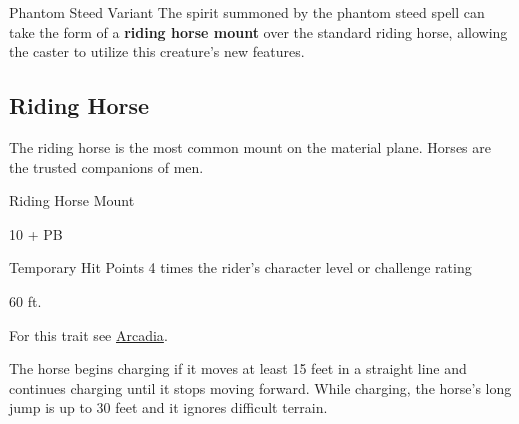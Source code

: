 \documentclass[letterpaper,twocolumn,openany,nodeprecatedcode]{dndbook}
\begin{document}
\begin{DndComment}{Phantom Steed Variant}
    The spirit summoned by the phantom steed spell can take the form of a \textbf{riding horse mount} over the standard riding horse, allowing the caster to utilize this creature’s new features.
\end{DndComment}

\subsection{Riding Horse}
The riding horse is the most common mount on the material plane.
Horses are the trusted companions of men.

\begin{DndMonster}[float*=b,width=\textwidth + 8pt]{Riding Horse Mount}
  \begin{multicols}{2}

    \DndMonsterLine
    \begin {CustomBasics}
      \item[\armorclassname] 10 + PB
      \item[Temporary Hit Points] 4 times the rider's character level or challenge rating
      \item[\hitpointsname]  
      \item[\speedname] 60 ft.
    \end {CustomBasics}
    \DndMonsterLine

    \DndMonsterAbilityScores[
        str = 16,
        dex = 10,
        con = 12,
        int = 2,
        wis = 11,
        cha = 7,
      ]

    \DndMonsterDetails[
        senses = {passive Perception 10},
        languages = {-},
        challenge = 1/4,
      ]

    For this trait see \href{https://www.youtube.com/watch?v=oid4QMMXjfs}{Arcadia}.

    The horse begins charging if it moves at least 15 feet in a straight line and continues charging until it stops moving forward. While charging, the horse’s long jump is up to 30 feet and it ignores difficult terrain.


\end{multicols}
\end{DndMonster}
\end{document}
